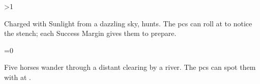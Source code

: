 \ifnum\value{temperature}>1

\basilisk

Charged with Sunlight from a dazzling sky,  hunts.
The \glspl{pc} can roll  at \tn[5] to notice the stench; each Success Margin gives them  to prepare.

\else

\ifnum\value{temperature}=0
\fi

Five horses wander through a distant clearing by a river.
The \glspl{pc} can spot them with  at \tn[10].


\fi
